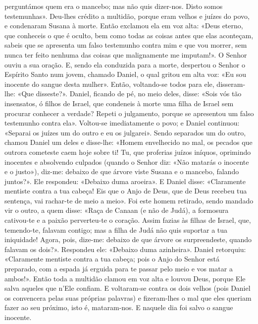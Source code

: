 \begin{paracol}{2}
{perguntámos quem era o mancebo; mas não quis dizer-nos. Disto somos testemunhas». Deu-lhes crédito a multidão, porque eram velhos e juízes do povo, e condenaram Susana à morte. Então exclamou ela em voz alta: «Deus eterno, que conheceis o que é oculto, bem como todas as coisas antes que elas aconteçam, sabeis que se apresenta um falso testemunho contra mim e que vou morrer, sem nunca ter feito nenhuma das coisas que malignamente me imputam!». O Senhor ouviu a sua oração. E, sendo ela conduzida para a morte, despertou o Senhor o Espírito Santo num jovem, chamado Daniel, o qual gritou em alta voz: «Eu sou inocente do sangue desta mulher». Então, voltando-se todos para ele, disseram-lhe: «Que disseste?». Daniel, ficando de pé, no meio deles, disse: «Sois vós tão insensatos, ó filhos de Israel, que condeneis à morte uma filha de Israel sem procurar conhecer a verdade? Repeti o julgamento, porque se apresentou um falso testemunho contra ela». Voltou-se imediatamente o povo; e Daniel continuou: «Separai os juízes um do outro e eu os julgarei». Sendo separados um do outro, chamou Daniel um deles e disse-lhe: «Homem envelhecido no mal, os pecados que outrora cometeste caem hoje sobre ti! Tu, que proferias juízos iníquos, oprimindo inocentes e absolvendo culpados (quando o Senhor diz: «Não matarás o inocente e o justo»), diz-me: debaixo de que árvore viste Susana e o mancebo, falando juntos?». Ele respondeu: «Debaixo duma aroeira». E Daniel disse: «Claramente mentiste contra a tua cabeça! Eis que o Anjo de Deus, que de Deus recebeu tua sentença, vai rachar-te de meio a meio». Foi este homem retirado, sendo mandado vir o outro, a quem disse: «Raça de Canaan (e não de Judá), a formosura cativou-te e a paixão perverteu-te o coração. Assim fazias às filhas de Israel, que, temendo-te, falavam contigo; mas a filha de Judá não quis suportar a tua iniquidade! Agora, pois, dize-me: debaixo de que árvore os surpreendeste, quando falavam os dois?». Respondeu ele: «Debaixo duma azinheira». Daniel retorquiu: «Claramente mentiste contra a tua cabeça; pois o Anjo do Senhor está preparado, com a espada já erguida para te passar pelo meio e vos matar a ambos!». Então toda a multidão clamou em voz alta e louvou Deus, porque Ele salva aqueles que n’Ele confiam. E voltaram-se contra os dois velhos (pois Daniel os convencera pelas suas próprias palavras) e fizeram-lhes o mal que eles queriam fazer ao seu próximo, isto é, mataram-nos. E naquele dia foi salvo o sangue inocente.
}\end{paracol}

\begin{paracol}{2}\switchcolumn{}\end{paracol}

